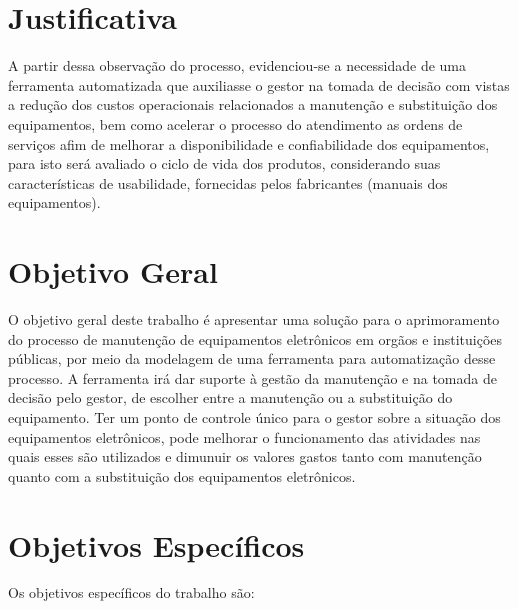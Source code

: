 
\section{Justificativa}

A partir dessa observação do processo, evidenciou-se a necessidade de uma ferramenta automatizada que auxiliasse o gestor na tomada de decisão com vistas a redução dos custos operacionais relacionados a manutenção e substituição dos equipamentos, bem como acelerar o processo do atendimento as ordens de serviços afim de melhorar a disponibilidade e confiabilidade dos equipamentos, para isto será avaliado o ciclo de vida dos produtos, considerando suas características de usabilidade, fornecidas pelos fabricantes (manuais dos equipamentos).


\section{Objetivo Geral}

O objetivo geral deste trabalho é apresentar uma solução para o aprimoramento do processo de manutenção de equipamentos eletrônicos em orgãos e instituições públicas, por meio da modelagem de uma ferramenta para automatização desse processo. A ferramenta irá dar suporte à gestão da manutenção e na tomada de decisão pelo gestor, de escolher entre a manutenção ou a substituição do equipamento. Ter um ponto de controle único para o gestor sobre a situação dos equipamentos eletrônicos, pode melhorar o funcionamento das atividades nas quais esses são utilizados e dimunuir os valores gastos tanto com manutenção quanto com a substituição dos equipamentos eletrônicos.


\section{Objetivos Específicos}

Os objetivos específicos do trabalho são:

